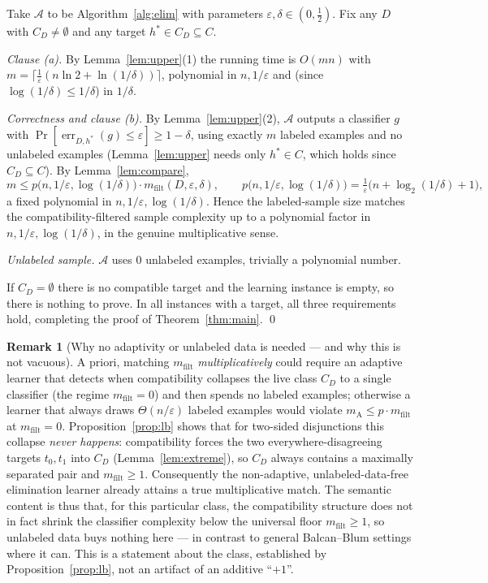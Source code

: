 \documentclass{amsart}
\theoremstyle{definition}
\newtheorem{remark}{Remark}
\DeclareMathOperator{\err}{err}
\newcommand{\eps}{\varepsilon}
\begin{document}
Take $\mathcal A$ to be Algorithm~\ref{alg:elim} with parameters
$\eps,\delta\in(0,\tfrac12)$. Fix any $D$ with $C_D\neq\emptyset$ and any target
$h^\ast\in C_D\subseteq C$.

\emph{Clause (a).} By Lemma~\ref{lem:upper}(1) the running time is $O(mn)$ with
$m=\lceil\frac1\eps(n\ln2+\ln(1/\delta))\rceil$, polynomial in $n,1/\eps$ and
(since $\log(1/\delta)\le1/\delta$) in $1/\delta$.

\emph{Correctness and clause (b).} By Lemma~\ref{lem:upper}(2), $\mathcal A$
outputs a classifier $g$ with $\Pr[\err_{D,h^\ast}(g)\le\eps]\ge1-\delta$, using
exactly $m$ labeled examples and no unlabeled examples (Lemma~\ref{lem:upper}
needs only $h^\ast\in C$, which holds since $C_D\subseteq C$). By
Lemma~\ref{lem:compare},
\[
  m \le p\bigl(n,1/\eps,\log(1/\delta)\bigr)\cdot
        m_{\mathrm{filt}}(D,\eps,\delta),
  \qquad p\bigl(n,1/\eps,\log(1/\delta)\bigr)=\tfrac1\eps\bigl(n+\log_2(1/\delta)+1\bigr),
\]
a fixed polynomial in $n,1/\eps,\log(1/\delta)$. Hence the labeled-sample size
matches the compatibility-filtered sample complexity up to a polynomial factor in
$n,1/\eps,\log(1/\delta)$, in the genuine multiplicative sense.

\emph{Unlabeled sample.} $\mathcal A$ uses $0$ unlabeled examples, trivially a
polynomial number.

If $C_D=\emptyset$ there is no compatible target and the learning instance is
empty, so there is nothing to prove. In all instances with a target, all three
requirements hold, completing the proof of Theorem~\ref{thm:main}. \qed

\begin{remark}[Why no adaptivity or unlabeled data is needed --- and why this is
not vacuous]
A priori, matching $m_{\mathrm{filt}}$ \emph{multiplicatively} could require an
adaptive learner that detects when compatibility collapses the live class
$C_D$ to a single classifier (the regime $m_{\mathrm{filt}}=0$) and then spends
no labeled examples; otherwise a learner that always draws $\Theta(n/\eps)$
labeled examples would violate $m_{\mathrm A}\le p\cdot m_{\mathrm{filt}}$ at
$m_{\mathrm{filt}}=0$. Proposition~\ref{prop:lb} shows that for two-sided
disjunctions this collapse \emph{never happens}: compatibility forces the two
everywhere-disagreeing targets $t_0,t_1$ into $C_D$ (Lemma~\ref{lem:extreme}),
so $C_D$ always contains a maximally separated pair and $m_{\mathrm{filt}}\ge1$.
Consequently the non-adaptive, unlabeled-data-free elimination learner already
attains a true multiplicative match. The semantic content is thus that, for this
particular class, the compatibility structure does not in fact shrink the
classifier complexity below the universal floor $m_{\mathrm{filt}}\ge1$, so
unlabeled data buys nothing here --- in contrast to general Balcan--Blum settings
where it can. This is a statement about the class, established by
Proposition~\ref{prop:lb}, not an artifact of an additive ``$+1$''.
\end{remark}
\end{document}
